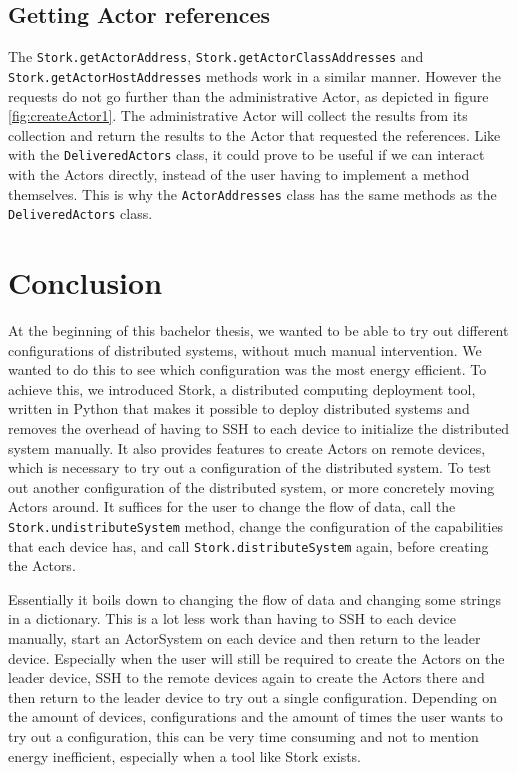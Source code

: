 \documentclass[a4paper]{article}
\begin{document}
\subsection{Getting Actor references}
The \lstinline|Stork.getActorAddress|, \lstinline|Stork.getActorClassAddresses| and \lstinline|Stork.getActorHostAddresses| methods work in a similar manner. However the requests do not go further than the administrative Actor, as depicted in figure \ref{fig:createActor1}. The administrative Actor will collect the results from its collection and return the results to the Actor that requested the references. Like with the \lstinline{DeliveredActors} class, it could prove to be useful if we can interact with the Actors directly, instead of the user having to implement a method themselves. This is why the \lstinline{ActorAddresses} class has the same methods as the \lstinline{DeliveredActors} class.
\section{Conclusion}
At the beginning of this bachelor thesis, we wanted to be able to try out different configurations of distributed systems, without much manual intervention. We wanted to do this to see which configuration was the most energy efficient. To achieve this, we introduced Stork, a distributed computing deployment tool, written in Python that makes it possible to deploy distributed systems and removes the overhead of having to SSH to each device to initialize the distributed system manually. It also provides features to create Actors on remote devices, which is necessary to try out a configuration of the distributed system. To test out another configuration of the distributed system, or more concretely moving Actors around. It suffices for the user to change the flow of data, call the \lstinline|Stork.undistributeSystem| method, change the configuration of the capabilities that each device has, and call \lstinline|Stork.distributeSystem| again, before creating the Actors.

Essentially it boils down to changing the flow of data and changing some strings in a dictionary. This is a lot less work than having to SSH to each device manually, start an ActorSystem on each device and then return to the leader device. Especially when the user will still be required to create the Actors on the leader device, SSH to the remote devices again to create the Actors there and then return to the leader device to try out a single configuration. Depending on the amount of devices, configurations and the amount of times the user wants to try out a configuration, this can be very time consuming and not to mention energy inefficient, especially when a tool like Stork exists.
\printbibliography
\end{document}
